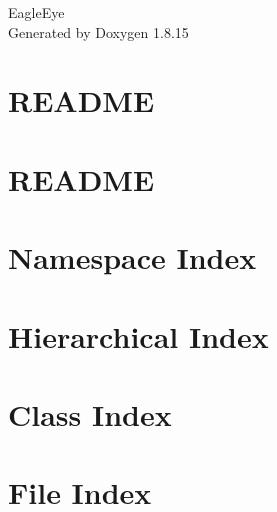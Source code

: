 \let\mypdfximage\pdfximage\def\pdfximage{\immediate\mypdfximage}\documentclass[twoside]{book}
\newcommand{\+}{\discretionary{\mbox{\scriptsize$\hookleftarrow$}}{}{}}
\newcommand{\clearemptydoublepage}{%
  \newpage{\pagestyle{empty}\cleardoublepage}%
}
\begin{document}
\hypersetup{pageanchor=false,
             bookmarksnumbered=true,
             pdfencoding=unicode
            }
\begin{titlepage}
\vspace*{7cm}
\begin{center}%
{\Large Eagle\+Eye }\\
\vspace*{1cm}
{\large Generated by Doxygen 1.8.15}\\
\end{center}
\end{titlepage}
\clearemptydoublepage
{}
\tableofcontents
\clearemptydoublepage
{}
\hypersetup{pageanchor=true}

\chapter{R\+E\+A\+D\+ME}
\label{md__c_1__gage__omega__programming__eagle_eye__eagle_eye_obj__release__package__package_tmp__scripts__r_e_a_d_m_e}

\chapter{R\+E\+A\+D\+ME}
\label{md__c_1__gage__omega__programming__eagle_eye__eagle_eye__scripts__r_e_a_d_m_e}

\chapter{Namespace Index}

\chapter{Hierarchical Index}

\chapter{Class Index}

\chapter{File Index}

\end{document}
